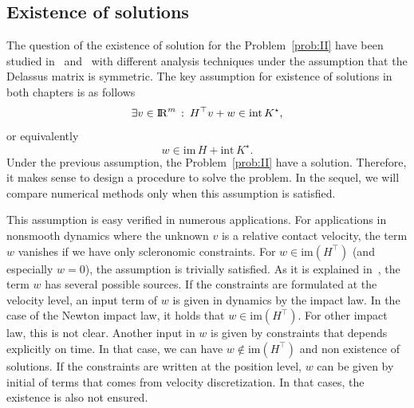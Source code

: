 {\subsection{Existence of solutions}
\label{sec:existence}

The question of the existence of solution for the Problem~\ref{prob:II} have been studied in~\cite{Klarbring.Pang1998} and~\cite{Acary.ea_ZAMM2011} with different analysis techniques under the assumption that the Delassus matrix is symmetric.
The key assumption for existence of solutions in both chapters is as follows
\begin{equation}\label{ass}
   \exists v\in \RR^m \,:\: H^\top v + w \in \mathrm{int}\, K^\star,
\end{equation}
or equivalently
\begin{equation}\label{asseq}
  w\in\mathrm{im}\, H + \mathrm{int}\, K^\star.
\end{equation}
Under the previous assumption, the Problem~\ref{prob:II} have a solution.
Therefore, it makes sense to design a procedure to solve the problem. In the sequel, we will compare numerical methods only when this assumption is satisfied.

This assumption is easy verified in numerous applications. For applications in nonsmooth dynamics where the unknown $v$ is a relative contact velocity, the term $w$ vanishes if we have only scleronomic constraints. For $w \in \mathrm{im}(H^\top)$ (and especially $w=0$), the assumption is trivially satisfied. As it is explained in~\cite{Acary.Cadoux2013}, the term $w$ has several possible sources. If the constraints are formulated at the velocity level, an input term of $w$ is given in dynamics by the impact law. In the case of the Newton impact law, it holds that $w \in \mathrm{im}(H^\top)$.   For other impact law, this is not clear. Another input in $w$ is given by constraints that depends explicitly on time. In that case, we can have $w \not\in \mathrm{im}(H^\top)$ and non existence of solutions. If the constraints are written at the position level, $w$ can be given by initial of terms that comes from velocity discretization. In that cases, the existence is also not ensured.

}
